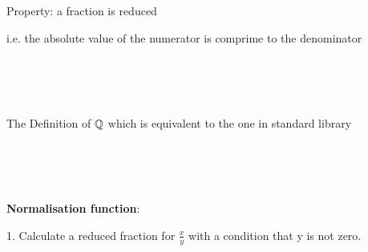 Property: a fraction is reduced

i.e. the absolute value of the numerator is comprime to the denominator

\begin{code}\>\<%
\\
\> \AgdaSymbol{:}   \<%
\\
\> \AgdaSymbol{(}  \AgdaSymbol{)} \AgdaSymbol{=}  \AgdaSymbol{(}    \AgdaSymbol{(} \AgdaSymbol{))}\<%
\\
\>\<\end{code}

The Definition of $\mathbb{Q}$ which is equivalent to the one in standard library

\begin{code}\>\<%
\\
\> \AgdaSymbol{:} \<%
\\
\> \AgdaSymbol{=} \AgdaRecord{Σ[}    \AgdaRecord{]}  \<%
\\
\>\<\end{code}

\textbf{Normalisation function}:

1. Calculate a reduced fraction for $\frac{x}{y}$ with a condition that y is not zero.


